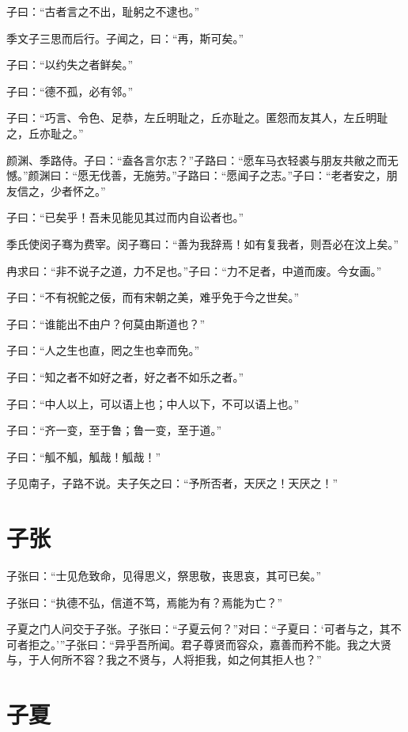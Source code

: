 \documentclass[a5paper]{ctexbook}
\begin{document}
    子曰：“古者言之不出，耻躬之不逮也。”

    季文子三思而后行。子闻之，曰：“再，斯可矣。”
    
    子曰：“以约失之者鲜矣。”

    子曰：“德不孤，必有邻。”

    子曰：“巧言、令色、足恭，左丘明耻之，丘亦耻之。匿怨而友其人，左丘明耻之，丘亦耻之。”

    颜渊、季路侍。子曰：“盍各言尔志？”子路曰：“愿车马衣轻裘与朋友共敝之而无憾。”颜渊曰：“愿无伐善，无施劳。”子路曰：“愿闻子之志。”子曰：“老者安之，朋友信之，少者怀之。”

    子曰：“已矣乎！吾未见能见其过而内自讼者也。”

    季氏使闵子骞为费宰。闵子骞曰：“善为我辞焉！如有复我者，则吾必在汶上矣。”

    冉求曰：“非不说子之道，力不足也。”子曰：“力不足者，中道而废。今女画。”

    子曰：“不有祝𬶍之佞，而有宋朝之美，难乎免于今之世矣。”

    子曰：“谁能出不由户？何莫由斯道也？”

    子曰：“人之生也直，罔之生也幸而免。”

    子曰：“知之者不如好之者，好之者不如乐之者。”

    子曰：“中人以上，可以语上也；中人以下，不可以语上也。”

    

    子曰：“齐一变，至于鲁；鲁一变，至于道。”

    子曰：“觚不觚，觚哉！觚哉！”

    子见南子，子路不说。夫子矢之曰：“予所否者，天厌之！天厌之！”

    \chapter{子张}

    子张曰：“士见危致命，见得思义，祭思敬，丧思哀，其可已矣。”
    
    子张曰：“执德不弘，信道不笃，焉能为有？焉能为亡？”
    
    子夏之门人问交于子张。子张曰：“子夏云何？”对曰：“子夏曰：‘可者与之，其不可者拒之。’”子张曰：“异乎吾所闻。君子尊贤而容众，嘉善而矜不能。我之大贤与，于人何所不容？我之不贤与，人将拒我，如之何其拒人也？”

    \chapter{子夏}
\end{document}
